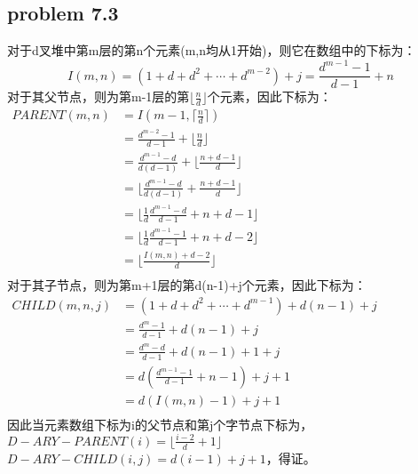 \documentclass[11pt]{ctexart}
\begin{document}
{	\subsection*{problem 7.3}
	对于d叉堆中第m层的第n个元素(m,n均从1开始)，则它在数组中的下标为：
	$$I(m,n)=(1+d+d^2+\cdots+d^{m-2})+j=\frac{d^{m-1}-1}{d-1}+n$$
	对于其父节点，则为第m-1层的第$\lfloor\frac{n}{d}\rfloor$个元素，因此下标为：\\
	$
	\begin{aligned}
	PARENT(m,n)&=I(m-1,\lceil\frac{n}{d}\rceil)\\
	&=\frac{d^{m-2}-1}{d-1}+\lfloor\frac{n}{d}\rfloor\\
	&=\frac{d^{m-1}-d}{d(d-1)}+\lfloor\frac{n+d-1}{d}\rfloor\\
	&=\lfloor\frac{d^{m-1}-d}{d(d-1)}+\frac{n+d-1}{d}\rfloor\\
	&=\lfloor\frac{1}{d}\frac{d^{m-1}-d}{d-1}+n+d-1\rfloor\\
	&=\lfloor\frac{1}{d}\frac{d^{m-1}-1}{d-1}+n+d-2\rfloor\\
	&=\lfloor\frac{I(m,n)+d-2}{d}\rfloor\\
	\end{aligned}
	$\\
	对于其子节点，则为第m+1层的第d(n-1)+j个元素，因此下标为：\\
	$
	\begin{aligned}
	CHILD(m,n,j)&=(1+d+d^2+\cdots+d^{m-1})+d(n-1)+j\\
	&=\frac{d^m-1}{d-1}+d(n-1)+j\\
	&=\frac{d^{m}-d}{d-1}+d(n-1)+1+j\\
	&=d(\frac{d^{m-1}-1}{d-1}+n-1)+j+1\\
	&=d(I(m,n)-1)+j+1\\
	\end{aligned}
	$\\
	因此当元素数组下标为i的父节点和第j个字节点下标为，\\
	$D-ARY-PARENT(i)=\lfloor\frac{i-2}{d}+1\rfloor$\\
	$D-ARY-CHILD(i,j)=d(i-1)+j+1$，得证。
}
\end{document}
